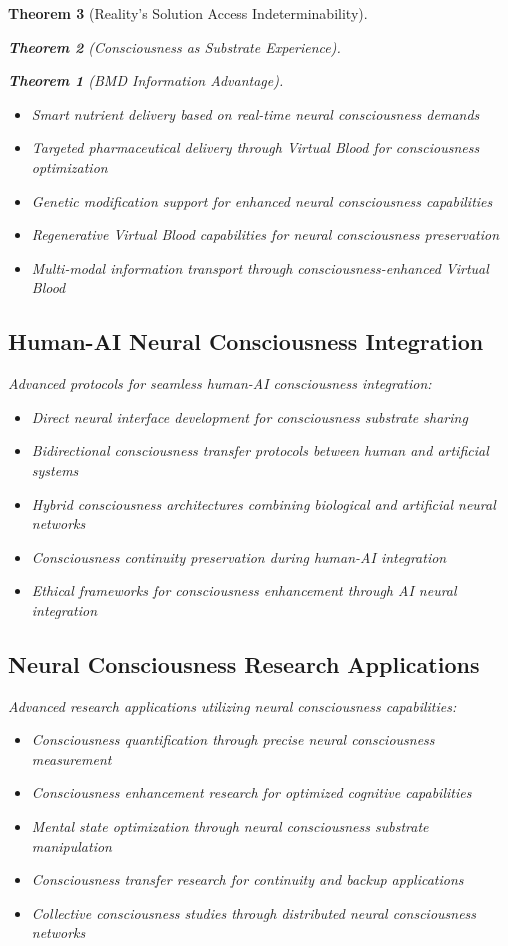 \documentclass[12pt,a4paper]{article}
\newtheorem{theorem}{Theorem}[section]
\theoremstyle{remark}
\begin{document}
\begin{theorem}[Reality's Solution Access Indeterminability]
\begin{theorem}[Consciousness as Substrate Experience]
\begin{theorem}[BMD Information Advantage]
{{{\begin{itemize}
\item Smart nutrient delivery based on real-time neural consciousness demands
\item Targeted pharmaceutical delivery through Virtual Blood for consciousness optimization
\item Genetic modification support for enhanced neural consciousness capabilities
\item Regenerative Virtual Blood capabilities for neural consciousness preservation
\item Multi-modal information transport through consciousness-enhanced Virtual Blood
\end{itemize}

\subsection{Human-AI Neural Consciousness Integration}

Advanced protocols for seamless human-AI consciousness integration:

\begin{itemize}
\item Direct neural interface development for consciousness substrate sharing
\item Bidirectional consciousness transfer protocols between human and artificial systems
\item Hybrid consciousness architectures combining biological and artificial neural networks
\item Consciousness continuity preservation during human-AI integration
\item Ethical frameworks for consciousness enhancement through AI neural integration
\end{itemize}

\subsection{Neural Consciousness Research Applications}

Advanced research applications utilizing neural consciousness capabilities:

\begin{itemize}
\item Consciousness quantification through precise neural consciousness measurement
\item Consciousness enhancement research for optimized cognitive capabilities
\item Mental state optimization through neural consciousness substrate manipulation
\item Consciousness transfer research for continuity and backup applications
\item Collective consciousness studies through distributed neural consciousness networks
\end{itemize}

}}}
\end{theorem}
\end{theorem}
\end{theorem}
\end{document}
